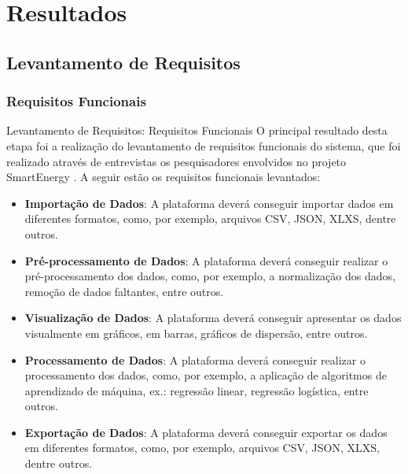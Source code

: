 

\section{Resultados}
\label{sec:resultados}

\subsection{Levantamento de Requisitos}
\label{subsec:levantamento-de-requisitos}

\subsubsection{Requisitos Funcionais}
\label{subsubsec:requisitos-funcionais}

\begin{frame}{Levantamento de Requisitos: Requisitos Funcionais}
	\quad O principal resultado desta etapa foi a realização do levantamento de requisitos funcionais do sistema, que foi realizado através de entrevistas os pesquisadores envolvidos no projeto SmartEnergy \cite{SmartEnergy}. A seguir estão os requisitos funcionais levantados:

	\begin{itemize}
		\item \textbf{Importação de Dados}: A plataforma deverá conseguir importar dados em diferentes formatos, como, por exemplo, arquivos CSV, JSON, XLXS, dentre outros.
		\item \textbf{Pré-processamento de Dados}: A plataforma deverá conseguir realizar o pré-processamento dos dados, como, por exemplo, a normalização dos dados, remoção de dados faltantes, entre outros.
		\item \textbf{Visualização de Dados}: A plataforma deverá conseguir apresentar os dados visualmente em gráficos, em barras, gráficos de dispersão, entre outros.
		\item \textbf{Processamento de Dados}: A plataforma deverá conseguir realizar o processamento dos dados, como, por exemplo, a aplicação de algoritmos de aprendizado de máquina, ex.: regressão linear, regressão logística, entre outros.
		\item \textbf{Exportação de Dados}: A plataforma deverá conseguir exportar os dados em diferentes formatos, como, por exemplo, arquivos CSV, JSON, XLXS, dentre outros.
	\end{itemize}
\end{frame}

